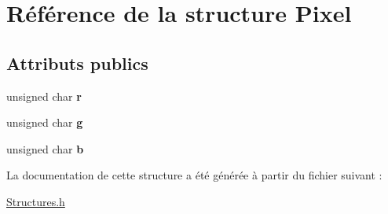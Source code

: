 \hypertarget{structPixel}{}\section{Référence de la structure Pixel}
\label{structPixel}
\subsection*{Attributs publics}
\begin{DoxyCompactItemize}
\item 
unsigned char {\bfseries r}\hypertarget{structPixel_a038ad5b3349e7548d17c5d3bec511b94}{}\label{structPixel_a038ad5b3349e7548d17c5d3bec511b94}

\item 
unsigned char {\bfseries g}\hypertarget{structPixel_a8407845aacf1663d9463475619911686}{}\label{structPixel_a8407845aacf1663d9463475619911686}

\item 
unsigned char {\bfseries b}\hypertarget{structPixel_a760bdf29b15433d257f119239fcff4d4}{}\label{structPixel_a760bdf29b15433d257f119239fcff4d4}

\end{DoxyCompactItemize}


La documentation de cette structure a été générée à partir du fichier suivant \+:\begin{DoxyCompactItemize}
\item 
\hyperlink{Structures_8h}{Structures.\+h}\end{DoxyCompactItemize}
